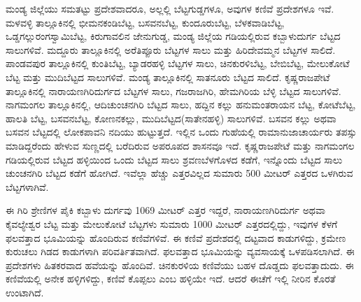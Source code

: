 ಮಂಡ್ಯ ಜಿಲ್ಲೆಯು ಸಮತಟ್ಟು ಪ್ರದೇಶವಾದರೂ, ಅಲ್ಲಲ್ಲಿ ಬೆಟ್ಟಗುಡ್ಡಗಳೂ, ಅವುಗಳ ಕಣಿವೆ ಪ್ರದೇಶಗಳೂ ಇವೆ. ಮಳವಳ್ಳಿ ತಾಲ್ಲೂಕಿನಲ್ಲಿ ಭೀಮನಕಂಡಿಬೆಟ್ಟ, ಬಸವನಬೆಟ್ಟ, ಕುಂದೂರುಬೆಟ್ಟ, ಬೆಳಕವಾಡಿಬೆಟ್ಟ, ಒಡ್ಡಗಲ್ಲುರಂಗಸ್ವಾಮಿಬೆಟ್ಟ, ಕಿರುಗಾವಲಿನ ಜೇನುಗುಡ್ಡ, ಮಂಡ್ಯ ಜಿಲ್ಲೆಯ ಗಡಿಯಲ್ಲಿರುವ ಕಬ್ಬಾಳುದುರ್ಗ ಬೆಟ್ಟದ ಸಾಲುಗಳಿವೆ. ಮದ್ದೂರು ತಾಲ್ಲೂಕಿನಲ್ಲಿ ಅರೆತಿಪ್ಪೂರು ಬೆಟ್ಟಗಳ ಸಾಲು ಮತ್ತು  ಹಿರಿದೇವಮ್ಮನ ಬೆಟ್ಟಗಳ ಸಾಲಿದೆ. ಪಾಂಡವಪುರ ತಾಲ್ಲೂಕಿನಲ್ಲಿ ಕುಂತಿಬೆಟ್ಟ, ಬ್ಯಾಡರಹಳ್ಳಿ ಬೆಟ್ಟಗಳ ಸಾಲು, ಚಿನಕುರಳಿಬೆಟ್ಟ, ಬೇಬಿಬೆಟ್ಟ, ಮೇಲುಕೋಟೆ ಬೆಟ್ಟ ಮತ್ತು ಮುದಿಬೆಟ್ಟದ ಸಾಲುಗಳಿವೆ. ಮಂಡ್ಯ ತಾಲ್ಲೂಕಿನಲ್ಲಿ ಸಾತನೂರು ಬೆಟ್ಟದ ಸಾಲಿದೆ. ಕೃಷ್ಣರಾಜಪೇಟೆ ತಾಲ್ಲೂಕಿನಲ್ಲಿ ನಾರಾಯಣಗಿರಿದುರ್ಗದ ಬೆಟ್ಟಗಳ ಸಾಲು, ಗಜರಾಜಗಿರಿ, ಹೇಮಗಿರಿಯ ಬೆಳ್ಳಿ ಬೆಟ್ಟದ ಸಾಲುಗಳಿವೆ. ನಾಗಮಂಗಲ ತಾಲ್ಲೂಕಿನಲ್ಲಿ, ಆದಿಚುಂಚನಗಿರಿ ಬೆಟ್ಟದ ಸಾಲು, ಹದ್ದಿನ ಕಲ್ಲು ಹನುಮಂತರಾಯನ ಬೆಟ್ಟ, ಕೋಟೆಬೆಟ್ಟ, ಹಾಲತಿ ಬೆಟ್ಟ, ಬಸವನಬೆಟ್ಟ, ಕೋಣನಕಲ್ಲು, ಮುದಿಬೆಟ್ಟದ(ಸಾತೇನಹಳ್ಳಿ) ಸಾಲುಗಳಿವೆ. ಬಸವನ ಕಲ್ಲು ಅಥವಾ ಬಸವನ ಬೆಟ್ಟದಲ್ಲಿ ಲೋಕಪಾವನಿ ನದಿಯು ಹುಟ್ಟುತ್ತದೆ. ಇಲ್ಲಿನ ಒಂದು ಗುಹೆಯಲ್ಲಿ ರಾಮಾನುಜಾಚಾರ್ಯರು ತಪಸ್ಸು ಮಾಡಿದ್ದರೆಂದು ಹೇಳುವ ಸುಣ್ಣದಲ್ಲಿ ಬರೆದಿರುವ ಅಪರೂಪದ ಶಾಸನವೂ ಇದೆ. ಕೃಷ್ಣರಾಜಪೇಟೆ ಮತ್ತು ನಾಗಮಂಗಲ ಗಡಿಯಲ್ಲಿರುವ ಬೆಟ್ಟದ ಹಳ್ಳಿಯಿಂದ ಒಂದು ಬೆಟ್ಟದ ಸಾಲು ಶ್ರವಣಬೆಳಗೊಳದ ಕಡೆಗೆ, ಇನ್ನೊಂದು ಬೆಟ್ಟದ ಸಾಲು ಚುಂಚನಗಿರಿ ಬೆಟ್ಟದ ಕಡೆಗೆ ಹೋಗಿದೆ. ಇವೆಲ್ಲಾ ಹೆಚ್ಚು ಎತ್ತರವಿಲ್ಲದ ಸುಮಾರು 500 ಮೀಟರ್ ಎತ್ತರದ ಒಳಗಿರುವ ಬೆಟ್ಟಗಳಾಗಿವೆ.

ಈ ಗಿರಿ ಶ್ರೇಣಿಗಳ ಪೈಕಿ ಕಬ್ಬಾಳು ದುರ್ಗವು 1069 ಮೀಟರ್ ಎತ್ತರ ಇದ್ದರೆ, ನಾರಾಯಣಗಿರಿದುರ್ಗ ಅಥವಾ ಕೈವಲ್ಯೇಶ್ವರ ಬೆಟ್ಟ ಮತ್ತು ಮೇಲುಕೋಟೆ ಬೆಟ್ಟಗಳು ಸುಮಾರು 1000 ಮೀಟರ್​ ಎತ್ತರದಲ್ಲಿದ್ದು, ಇವುಗಳ ಕೆಳಗೆ ಫಲವತ್ತಾದ ಭೂಮಿಯನ್ನು ಹೊಂದಿರುವ ಕಣಿವೆಗಳಿವೆ. ಈ ಕಣಿವೆ ಪ್ರದೇಶದಲ್ಲಿ ದಟ್ಟವಾದ ಕಾಡುಗಳಿದ್ದು, ಕ್ರಮೇಣ ಕುರುಚಲು ಗಿಡದ ಕಾಡುಗಳಾಗಿ ಪರಿವರ್ತಿತವಾಗಿದೆ. ಫಲವತ್ತಾದ ಭೂಮಿಯನ್ನು ವ್ಯವಸಾಯಕ್ಕೆ ಒಳಪಡಿಸಲಾಗಿದೆ. ಈ ಪ್ರದೇಶಗಳು ಹಿತಕರವಾದ ಹವೆಯನ್ನು ಹೊಂದಿವೆ. ಚಿನಕುರಳಿಯ ಕಣಿವೆಯು ಬಹಳ ದೊಡ್ಡದು ಫಲವತ್ತಾದುದು. ಈ ಕಣಿವೆಯಲ್ಲಿ ಅನೇಕ ಹಳ್ಳಿಗಳಿದ್ದು, ಕಣಿವೆ ಕೊಪ್ಪಲು ಎಂಬ ಹಳ್ಳಿಯೇ ಇದೆ. ಆದರೆ ಈಚೆಗೆ ಇಲ್ಲಿ ನೀರಿನ ಕೊರತೆ ಉಂಟಾಗಿದೆ.

\vskip -3pt

